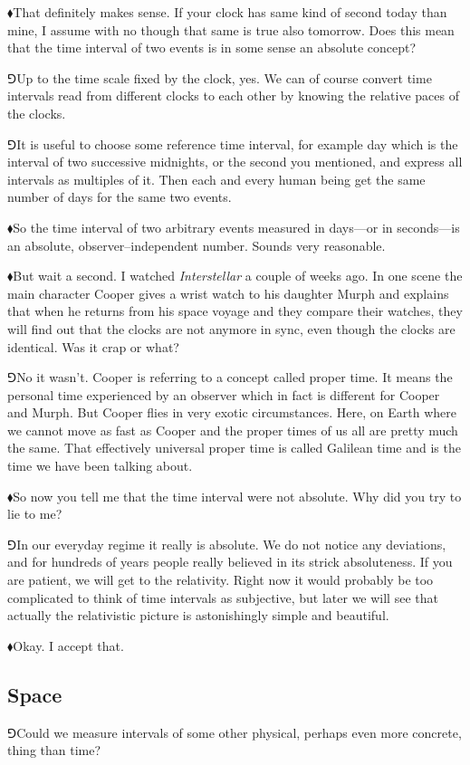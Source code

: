 \documentclass[10pt,oneside%
]{memoir}
\newcommand{\hea}{\(\blacklozenge\)\;}
\newcommand{\heb}{\(\Game\)\;}
\begin{document}
\hea That definitely makes sense. If your clock has same kind of second today than mine, I assume with no though that same is true also tomorrow. Does this mean that the time interval of two events is in some sense an absolute concept?

\heb Up to the time scale fixed by the clock, yes. We can of course convert time intervals read from different clocks to each other by knowing the relative paces of the clocks.

\heb It is useful to choose some reference time interval, for example day which is the interval of two successive midnights, or the second you mentioned, and express all intervals as multiples of it. Then each and every human being get the same number of days for the same two events.

\hea So the time interval of two arbitrary events measured in days---or in seconds---is an absolute, observer--independent number. Sounds very reasonable.

\hea But wait a second. I watched \emph{Interstellar} a couple of weeks ago. In one scene the main character Cooper gives a wrist watch to his daughter Murph and explains that when he returns from his space voyage and they compare their watches, they will find out that the clocks are not anymore in sync, even though the clocks are identical. Was it crap or what?

\heb No it wasn't. Cooper is referring to a concept called proper time. It means the personal time experienced by an observer which in fact is different for Cooper and Murph. But Cooper flies in very exotic circumstances. Here, on Earth where we cannot move as fast as Cooper and the proper times of us all are pretty much the same. That effectively universal proper time is called Galilean time and is the time we have been talking about.

\hea So now you tell me that the time interval were not absolute. Why did you try to lie to me?

\heb In our everyday regime it really is absolute. We do not notice any deviations, and for hundreds of years people really believed in its strick absoluteness. If you are patient, we will get to the relativity. Right now it would probably be too complicated to think of time intervals as subjective, but later we will see that actually the relativistic picture is astonishingly simple and beautiful.

\hea Okay. I accept that.
\subsection{Space}
\heb Could we measure intervals of some other physical, perhaps even more concrete, thing than time?
\end{document}
